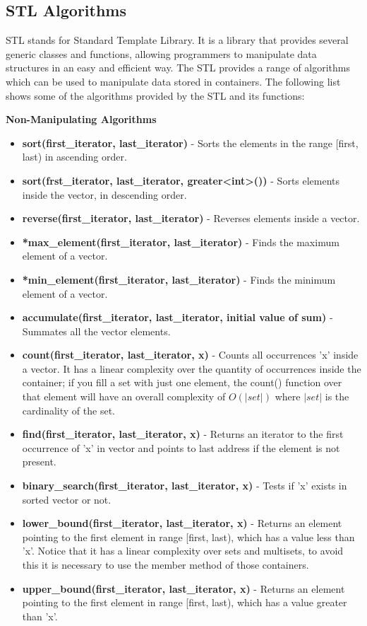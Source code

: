 \subsection{STL Algorithms}
\begin{justify}
STL stands for Standard Template Library. It is a library that provides several generic 
classes and functions, allowing programmers to manipulate data structures in an easy and efficient way.
The STL provides a range of algorithms which can be used to manipulate data stored in containers. The following 
list shows some of the algorithms provided by the STL and its functions:
\end{justify}
\textbf{Non-Manipulating Algorithms}
\begin{itemize}
\item \textbf{sort(first\_iterator, last\_iterator)} - Sorts the elements in the range [first, last) in ascending order.
\item \textbf{sort(frst\_iterator, last\_iterator, greater\textless int\textgreater())} - Sorts elements inside the vector, in descending order.
\item \textbf{reverse(first\_iterator, last\_iterator)} - Reverses elements inside a vector.
\item \textbf{*max\_element(first\_iterator, last\_iterator)} - Finds the maximum element of a vector.
\item \textbf{*min\_element(first\_iterator, last\_iterator)} - Finds the minimum element of a vector.
\item \textbf{accumulate(first\_iterator, last\_iterator, initial value of sum)} - Summates all the vector elements.
\item \textbf{count(first\_iterator, last\_iterator, x)} - Counts all occurrences 'x' inside a vector. It has a linear complexity over the quantity of occurrences inside the container; if you fill a set with just one element, the count() function over that element will have an overall complexity of $O(|set|)$ where $|set|$ is the cardinality of the set. 
\item \textbf{find(first\_iterator, last\_iterator, x)} - Returns an iterator to the first occurrence of 'x' in vector and points to last address if the element is not present.
\item \textbf{binary\_search(first\_iterator, last\_iterator, x)} - Tests if 'x' exists in sorted vector or not.
\item \textbf{lower\_bound(first\_iterator, last\_iterator, x)} - Returns an element pointing to the first element in range [first, last), which has a value less than 'x'. Notice that it has a linear complexity over sets and multisets, to avoid this it is necessary to use the member method of those containers. 
\item \textbf{upper\_bound(first\_iterator, last\_iterator, x)} - Returns an element pointing to the first element in range [first, last), which has a value greater than 'x'.
\end{itemize}
